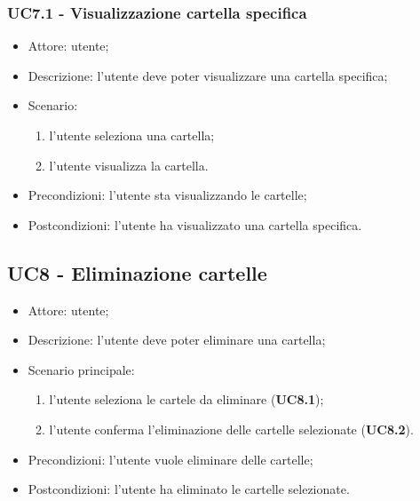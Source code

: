     \subsubsection{UC7.1 - Visualizzazione cartella specifica}
    \begin{itemize}
        \item Attore: utente;
        \item Descrizione: l'utente deve poter visualizzare una cartella specifica;
        \item Scenario:
        \begin{enumerate}
        \item l'utente seleziona una cartella;
        \item l'utente visualizza la cartella.
        \end{enumerate}
        \item Precondizioni: l'utente sta visualizzando le cartelle;
        \item Postcondizioni: l'utente ha visualizzato una cartella specifica.
    \end{itemize}

    \subsection{UC8 - Eliminazione cartelle}
    \begin{itemize}
        \item Attore: utente;
        \item Descrizione: l'utente deve poter eliminare una cartella;
        \item Scenario principale:
            \begin{enumerate}
            \item l'utente seleziona le cartele da eliminare (\textbf{UC8.1});
            \item l'utente conferma l'eliminazione delle cartelle selezionate (\textbf{UC8.2}).
            \end{enumerate}
        \item Precondizioni: l'utente vuole eliminare delle cartelle;
        \item Postcondizioni: l'utente ha eliminato le cartelle selezionate.
    \end{itemize}
